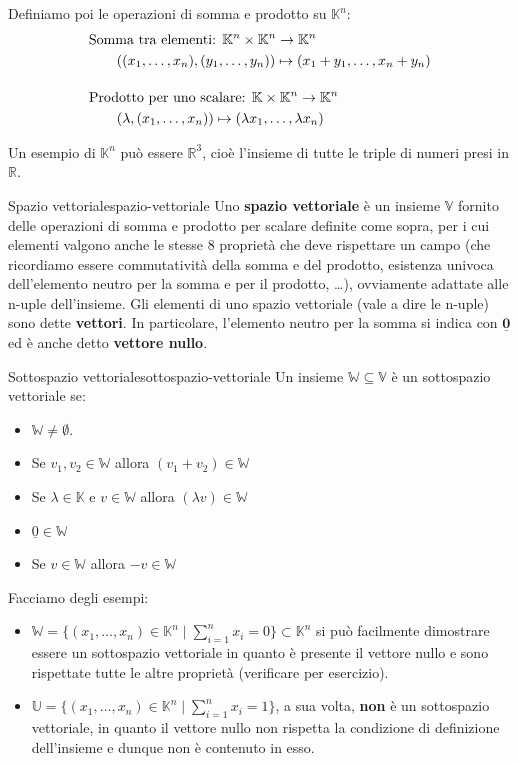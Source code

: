 \documentclass[12pt]{report}
\newcommand{\R}{\mathbb{R}}
\newcommand{\K}{\mathbb{K}}
\newcommand{\V}{\mathbb{V}}
\newcommand{\W}{\mathbb{W}}
\newcommand{\vectorspace}[1]{\mathbb{#1}}
\newcommand{\genericvector}[1]{(#1_1, \dots, #1_n)}
\newcommand{\nullvector}{\underline{0}}
\begin{document}
	Definiamo poi le operazioni di somma e prodotto su $\K^n$:
	\[
		\begin{aligned}
			&\text{Somma tra elementi: } \K^n \times \K^n \to \K^n \\
			&\hspace{0.7cm}(\genericvector{x}, \genericvector{y}) \mapsto (x_1 + y_1, \dots, x_n + y_n) \\[0.4cm]
			&\text{Prodotto per uno scalare: } \K \times \K^n \to \K^n \\
			&\hspace{0.7cm}(\lambda, \genericvector{x}) \mapsto (\lambda x_1, \dots, \lambda x_n)
		\end{aligned}
	\]
	
	Un esempio di $\K^n$ può essere $\R^3$, cioè l'insieme di tutte le triple di numeri presi in $\R$.
	
	\begin{definizione}{Spazio vettoriale}{spazio-vettoriale}
		Uno \textbf{spazio vettoriale} è un insieme $\V$ fornito delle operazioni di somma e prodotto per scalare definite come sopra, per i cui elementi valgono anche le stesse 8 proprietà che deve rispettare un campo (che ricordiamo essere commutatività della somma e del prodotto, esistenza univoca dell'elemento neutro per la somma e per il prodotto, \dots), ovviamente adattate alle n-uple dell'insieme.
		Gli elementi di uno spazio vettoriale (vale a dire le n-uple) sono dette \textbf{vettori}.
		In particolare, l'elemento neutro per la somma si indica con $\mathbf{\nullvector}$ ed è anche detto \textbf{vettore nullo}.
	\end{definizione}
	
	
	\begin{definizione}{Sottospazio vettoriale}{sottospazio-vettoriale}
		Un insieme $\W \subseteq \V$ è un sottospazio vettoriale se:
		\begin{itemize}
			\item $\W \neq \emptyset$.
			\item Se $v_1, v_2 \in \W$ allora $(v_1 + v_2) \in \W$  
			\item Se $\lambda \in \K$ e $v \in \W$ allora $(\lambda v) \in \W$
			\item $\nullvector \in \W$
			\item Se $v \in \W$ allora $-v \in \W$
		\end{itemize}
	\end{definizione}
	
	Facciamo degli esempi:
	\begin{itemize}
		\item $\W = \{\genericvector{x} \in \K^n \mid \sum_{i=1}^{n}x_i = 0\} \subset \K^n$ si può facilmente dimostrare essere un sottospazio vettoriale in quanto è presente il vettore nullo e sono rispettate tutte le altre proprietà (verificare per esercizio).
		\item $\vectorspace{U} = \{\genericvector{x} \in \K^n \mid \sum_{i=1}^{n}x_i = 1\}$, a sua volta, \textbf{non} è un sottospazio vettoriale, in quanto il vettore nullo non rispetta la condizione di definizione dell'insieme e dunque non è contenuto in esso.
	\end{itemize}
	
\end{document}
